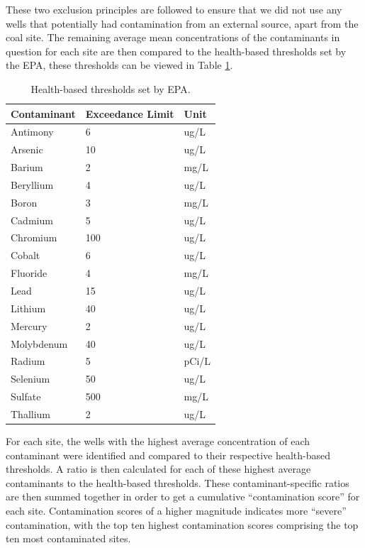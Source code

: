 \documentclass[12pt, twoside]{amherstthesis}
\begin{document}
These two exclusion principles are followed to ensure that we did not use any wells that potentially had contamination from an external source, apart from the coal site. The remaining average mean concentrations of the contaminants in question for each site are then compared to the health-based thresholds set by the EPA, these thresholds can be viewed in Table \ref{tab:hbt}.
\begin{table}

\caption{\label{tab:hbt}Health-based thresholds set by EPA.}
\centering
\begin{tabular}[t]{lll}
\toprule
Contaminant & Exceedance Limit & Unit\\
\midrule
Antimony & 6 & ug/L\\
\addlinespace
Arsenic & 10 & ug/L\\
\addlinespace
Barium & 2 & mg/L\\
\addlinespace
Beryllium & 4 & ug/L\\
\addlinespace
Boron & 3 & mg/L\\
\addlinespace
Cadmium & 5 & ug/L\\
\addlinespace
Chromium & 100 & ug/L\\
\addlinespace
Cobalt & 6 & ug/L\\
\addlinespace
Fluoride & 4 & mg/L\\
\addlinespace
Lead & 15 & ug/L\\
\addlinespace
Lithium & 40 & ug/L\\
\addlinespace
Mercury & 2 & ug/L\\
\addlinespace
Molybdenum & 40 & ug/L\\
\addlinespace
Radium & 5 & pCi/L\\
\addlinespace
Selenium & 50 & ug/L\\
\addlinespace
Sulfate & 500 & mg/L\\
\addlinespace
Thallium & 2 & ug/L\\
\bottomrule
\end{tabular}
\end{table}
For each site, the wells with the highest average concentration of each contaminant were identified and compared to their respective health-based thresholds. A ratio is then calculated for each of these highest average contaminants to the health-based thresholds. These contaminant-specific ratios are then summed together in order to get a cumulative ``contamination score'' for each site. Contamination scores of a higher magnitude indicates more ``severe'' contamination, with the top ten highest contamination scores comprising the top ten most contaminated sites.
\end{document}
